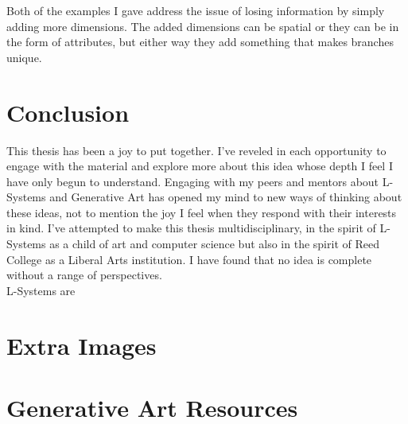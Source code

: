\documentclass[12pt,twoside]{reedthesis}
\begin{document}
	Both of the examples I gave address the issue of losing information by simply adding more dimensions. The added dimensions can be spatial or they can be in the form of attributes, but either way they add something that makes branches unique.\\


\chapter{Conclusion}
	\setcounter{section}{0}
	
	This thesis has been a joy to put together. I've reveled in each opportunity to engage with the material and explore more about this idea whose depth I feel I have only begun to understand. Engaging with my peers and mentors about L-Systems and Generative Art has opened my mind to new ways of thinking about these ideas, not to mention the joy I feel when they respond with their interests in kind. I've attempted to make this thesis multidisciplinary, in the spirit of L-Systems as a child of art and computer science but also in the spirit of Reed College as a Liberal Arts institution. I have found that no idea is complete without a range of perspectives.\\
	
	L-Systems are 

    \appendix
      \chapter{Extra Images}
      
      \chapter{Generative Art Resources}

\backmatter 
\nocite{*}


 
\end{document}
